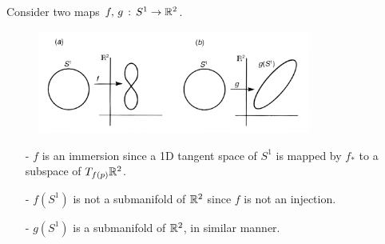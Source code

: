 \documentclass[a4paper, 10pt]{article}
\begin{document}
\begin{example}
    Consider two maps $f,\,g\,:\,S^{1} \rightarrow \mathbb{R}^{2}$.
    
    \begin{figure}[htbp]
        \centering
        \includegraphics[width=0.8\textwidth]{../images/lecture06/6_03.png}
    \end{figure}

    \begin{itemize}
        \item[-] $f$ is an immersion since a 1D tangent space of $S^{1}$ is mapped by $f_{\ast}$ to a subspace of $T_{f(p)}\mathbb{R}^{2}$.
        \item[-] $f(S^{1})$ is not a submanifold of $\mathbb{R}^{2}$ since $f$ is not an injection.
        \item[-] $g(S^{1})$ is a submanifold of $\mathbb{R}^{2}$, in similar manner.
    \end{itemize}
\end{example}
\end{document}
